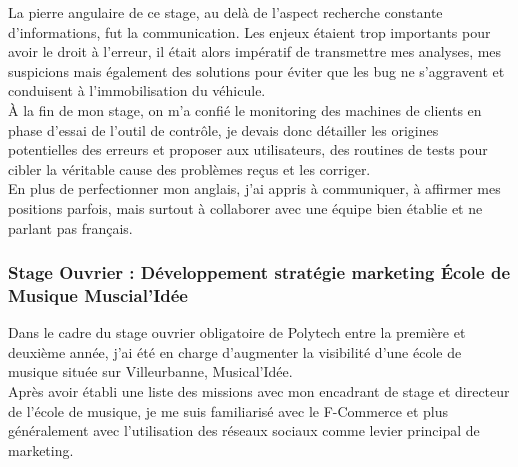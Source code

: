 \documentclass[french]{article}
\newcommand{\sbrown}{\color{sbrown}}
\begin{document}
  La pierre angulaire de ce stage, au delà de l'aspect recherche constante d'informations, fut la communication. Les enjeux étaient trop importants pour avoir le droit à l'erreur, il était alors impératif de transmettre mes analyses, mes suspicions mais également des solutions pour éviter que les bug ne s'aggravent et conduisent à l'immobilisation du véhicule.\\
  À la fin de mon stage, on m'a confié le monitoring des machines de clients en phase d'essai de l'outil de contrôle, je devais donc détailler les origines potentielles des erreurs et proposer aux utilisateurs, des routines de tests pour cibler la véritable cause des problèmes reçus et les corriger.\\ 
  
  En plus de perfectionner mon anglais, j'ai appris à communiquer, à affirmer mes positions parfois, mais surtout à collaborer avec une équipe bien établie et ne parlant pas français.
 
 \subsubsection*{\sbrown Stage Ouvrier : Développement stratégie marketing École de Musique Muscial'Idée} 
 Dans le cadre du stage ouvrier obligatoire de Polytech entre la première et deuxième année, j'ai été en charge d'augmenter la visibilité d'une école de musique située sur Villeurbanne, Musical'Idée. \\
 Après avoir établi une liste des missions avec mon encadrant de stage et directeur de l'école de musique, je me suis familiarisé avec le F-Commerce et plus généralement avec l'utilisation des réseaux sociaux comme levier principal de marketing. \\
\end{document}
